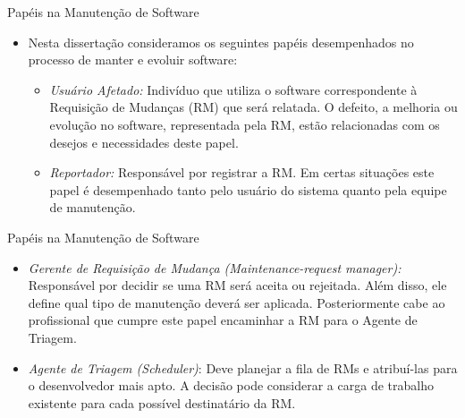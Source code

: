 \documentclass[t,14pt,mathserif]{beamer}
\begin{document}
\begin{frame}{Papéis na Manutenção de Software}
	\begin{itemize}
        \item Nesta dissertação consideramos os seguintes papéis desempenhados
            no processo de manter e evoluir software:
            \begin{itemize}
                \item \textit{Usuário Afetado:} Indivíduo que utiliza o software
                    correspondente à Requisição de Mudanças (RM) que será
                    relatada. O defeito, a melhoria ou evolução no software,
                    representada pela RM, estão relacionadas com os desejos e
                    necessidades deste papel.

                \item \textit{Reportador:} Responsável por registrar a RM\@. Em
                    certas situações este papel é desempenhado tanto pelo
                    usuário do sistema quanto pela equipe de manutenção.
            \end{itemize}
	\end{itemize}
\end{frame}

\begin{frame}{Papéis na Manutenção de Software}
	\begin{itemize}
        \item \textit{Gerente de Requisição de Mudança (Maintenance-request
                manager):} Res\-pon\-sá\-vel por decidir se uma RM será aceita
            ou rejeitada. Além disso, ele define qual tipo de manutenção deverá
            ser aplicada. Posteriormente cabe ao profissional que cumpre este
            papel encaminhar a RM para o Agente de Triagem.

        \item \textit{Agente de Triagem (Scheduler)}: Deve planejar a fila de
            RMs e atribuí-las para o desenvolvedor mais apto. A decisão pode
            considerar a carga de trabalho existente para cada possível
            destinatário da RM\@.
	\end{itemize}
\end{frame}
\end{document}
